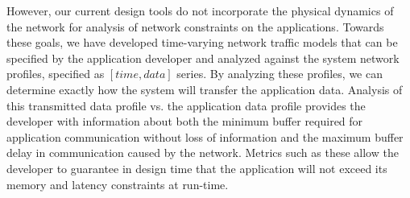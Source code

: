 
However, our current design tools do not incorporate the physical dynamics of the network for analysis of network constraints on the applications.  Towards these goals, we have developed time-varying network traffic models that can be specified by the application developer and analyzed against the system network profiles, specified as $[time,data]$ series. By analyzing these profiles, we can determine exactly how the system will transfer the application data. Analysis of this transmitted data profile vs. the application data profile provides the developer with information about both the minimum buffer required for application communication without loss of information and the maximum buffer delay in communication caused by the network.  Metrics such as these allow the developer to guarantee in design time that the application will not exceed its memory and latency constraints at run-time.  

\fi

